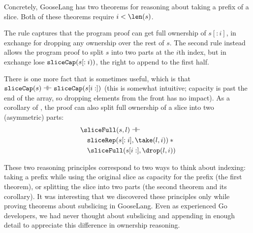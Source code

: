 Concretely, GooseLang has two theorems for reasoning about taking a prefix of a
slice. Both of these theorems require $i < \len(s)$.
\begin{mathpar}

\end{mathpar}

The rule  captures that the program proof can get full ownership of
$s[:i]$, in exchange for dropping any ownership over the rest of $s$.
The second rule  instead allows the program proof to split $s$ into two
parts at the $i$th index, but in exchange lose $\sliceCap(s[:i))$, the right
to append to the first half.

There is one more fact that is sometimes useful, which is that
$\sliceCap(s) \dashv\vdash \sliceCap(s[i:])$ (this is somewhat intuitive;
capacity is past the end of the array, so dropping elements from the front has
no impact). As a corollary of , the proof can also split full
ownership of a slice into two (asymmetric) parts:
\begin{align*}
  &\sliceFull(s, l) \dashv\vdash \\
  &\quad \sliceRep(s[:i], \take(l, i)) \sep {} \\
  &\quad \sliceFull(s[i:], \drop(l, i))
\end{align*}

These two reasoning principles correspond to two ways to think about indexing:
taking a prefix while using the original slice as capacity for the prefix (the
first theorem), or splitting the slice into two parts (the second theorem and
its corollary). It was interesting that we discovered these principles only
while proving theorems about subslicing in GooseLang. Even as experienced Go
developers, we had never thought about subslicing and appending in enough detail
to appreciate this difference in ownership reasoning.

